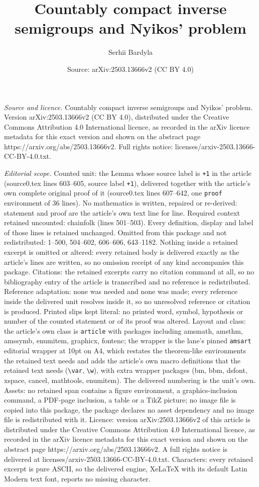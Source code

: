 \documentclass[10pt,a4paper]{amsart}
\title[Countably compact inverse semigroups and Nyikos' problem]{Countably compact inverse semigroups and Nyikos' problem}
\author{Serhii Bardyla}
\date{Source: arXiv:2503.13666v2 (CC BY 4.0)}
\begin{document}
\maketitle

\noindent\emph{Source and licence.} Countably compact inverse semigroups and Nyikos' problem. Version arXiv:2503.13666v2 (CC BY 4.0), distributed under the Creative Commons Attribution 4.0 International licence, as recorded in the arXiv licence metadata for this exact version and shown on the abstract page https://arxiv.org/abs/2503.13666v2. Full rights notice: licenses/arxiv-2503.13666-CC-BY-4.0.txt.\par\smallskip

\noindent\textit{Editorial scope.} Counted unit: the Lemma whose source label is \texttt{+1} in the article (source0.tex lines 603--605, source label \texttt{+1}), delivered together with the article's own complete original proof of it (source0.tex lines 607--642, one \texttt{proof} environment of 36 lines). No mathematics is written, repaired or re-derived: statement and proof are the article's own text line for line. Required context retained uncounted: chainfolk (lines 501--503). Every definition, display and label of those lines is retained unchanged. Omitted from this package and not redistributed: 1--500, 504--602, 606--606, 643--1182. Nothing inside a retained excerpt is omitted or altered: every retained body is delivered exactly as the article's lines are written, so no omission receipt of any kind accompanies this package. Citations: the retained excerpts carry no citation command at all, so no bibliography entry of the article is transcribed and no reference is redistributed. Reference adaptation: none was needed and none was made; every reference inside the delivered unit resolves inside it, so no unresolved reference or citation is produced. Printed slips kept literal: no printed word, symbol, hypothesis or number of the counted statement or of its proof was altered. Layout and class: the article's own class is \texttt{article} with packages including amsmath, amsthm, amssymb, enumitem, graphicx, fontenc; the wrapper is the lane's pinned \texttt{amsart} editorial wrapper at 10pt on A4, which restates the theorem-like environments the retained text needs and adds the article's own macro definitions that the retained text needs (\texttt{\textbackslash var}, \texttt{\textbackslash w}), with extra wrapper packages (bm, bbm, dsfont, xspace, cancel, mathtools, enumitem). The delivered numbering is the unit's own. Assets: no retained span contains a figure environment, a graphics-inclusion command, a PDF-page inclusion, a table or a TikZ picture; no image file is copied into this package, the package declares no asset dependency and no image file is redistributed with it. Licence: version arXiv:2503.13666v2 of this article is distributed under the Creative Commons Attribution 4.0 International licence, as recorded in the arXiv licence metadata for this exact version and shown on the abstract page https://arxiv.org/abs/2503.13666v2. A full rights notice is delivered at licenses/arxiv-2503.13666-CC-BY-4.0.txt. Characters: every retained excerpt is pure ASCII, so the delivered engine, XeLaTeX with its default Latin Modern text font, reports no missing character.
\end{document}
